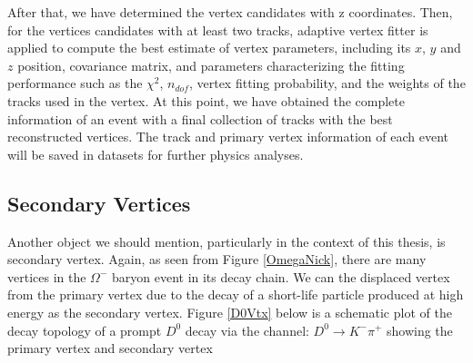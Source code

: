After that, we have determined the vertex candidates with z coordinates. Then,  for the vertices candidates with at least two tracks, adaptive vertex fitter \cite{AVT} is applied to compute the best estimate of vertex parameters, including its $x$, $y$ and $z$ position, covariance matrix, and parameters characterizing the fitting performance such as the $\chi^2$, $n_{dof}$, vertex fitting probability, and the weights of the tracks used in the vertex. At this point, we have obtained the complete information of an event with a final collection of tracks with the best reconstructed vertices. The track and primary vertex information of each event will be saved in datasets for further physics analyses.

\subsection{Secondary Vertices}

Another object we should mention, particularly in the context of this thesis, is secondary vertex. Again, as seen from Figure \ref{OmegaNick}, there are many vertices in the $\Omega^-$ baryon event in its decay chain. We can the displaced vertex from the primary vertex due to the decay of a short-life particle produced at high energy as the secondary vertex. Figure \ref{D0Vtx} below is a schematic plot of the decay topology of a prompt $D^0$ decay via the channel: $D^0 \rightarrow K^- \pi^+$ showing the primary vertex and secondary vertex  

